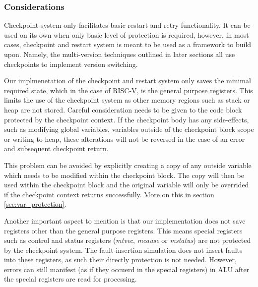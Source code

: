 \subsubsection{Considerations} \label{sec:checkpoint_considerations}

Checkpoint system only facilitates basic restart and retry functionality. It can be used on its own when only basic level of protection is required, however, in most cases, checkpoint and restart system is meant to be used as a framework to build upon. Namely, the multi-version techniques outlined in later sections all use checkpoints to implement version switching.

Our implmenetation of the checkpoint and restart system only saves the minimal required state, which in the case of RISC-V, is the general purpose registers. This limits the use of the checkpoint system as other memory regions such as stack or heap are not stored. Careful consideration needs to be given to the code block protected by the checkpoint context. If the checkpoint body has any side-effects, such as modifying global variables, variables outside of the checkpoint block scope or writing to heap, these alterations will not be reversed in the case of an error and subsequent checkpoint return.

This problem can be avoided by explicitly creating a copy of any outside variable which needs to be modified within the checkpoint block. The copy will then be used within the checkpoint block and the original variable will only be overrided if the checkpoint context returns successfully. More on this in section \ref{sec:var_protection}.

Another important aspect to mention is that our implementation does not save registers other than the general purpose registers. This means special registers such as control and status registers (\textit{mtvec}, \textit{mcause} or \textit{mstatus}) are not protected by the checkpoint system. The fault-insertion simulation does not insert faults into these registers, as such their directly protection is not needed. However, errors can still manifest (as if they occuerd in the special registers) in ALU after the special registers are read for processing.
